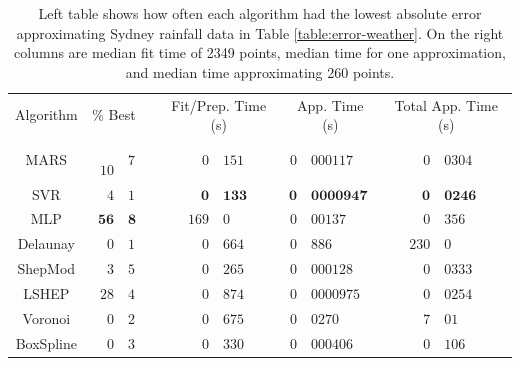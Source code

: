 \documentclass[smallextended,final]{svjour3}  %
\begin{document}
\begin{appendix}
\begin{table}
  \centering
  \begin{tabular}{|c|r@{.}l| c |r@{.}l|r@{.}l|r@{.}l|}
    \cline{1-3}\cline{5-10}
    Algorithm & \multicolumn{2}{c|}{\% Best} &  & \multicolumn{2}{c|}{Fit/Prep. Time (s)} & \multicolumn{2}{c|}{App. Time (s)} & \multicolumn{2}{c|}{Total App. Time (s)}\\
    \cline{1-3}\cline{5-10}
    MARS & \,\,\,\,$10$&$7$ &  & \quad\quad\quad$\mathit{0}$&$\mathit{151}$ & \quad$0$&$000117$ & \quad\quad\quad\,\,$0$&$0304$\\
    SVR & $4$&$1$ &  & $\mathbf{0}$&$\mathbf{133}$ & $\mathbf{0}$&$\mathbf{0000947}$ & $\mathbf{0}$&$\mathbf{0246}$\\
    MLP & $\mathbf{56}$&$\mathbf{8}$ &  & $169$&$0$ & $0$&$00137$ & $0$&$356$\\
    Delaunay & $0$&$1$ &  & $0$&$664$ & $0$&$886$ & $230$&$0$\\
    ShepMod & $3$&$5$ &  & $0$&$265$ & $0$&$000128$ & $0$&$0333$\\
    LSHEP & $\mathit{28}$&$\mathit{4}$ &  & $0$&$874$ & $\mathit{0}$&$\mathit{0000975}$ & $\mathit{0}$&$\mathit{0254}$\\
    Voronoi & $0$&$2$ &  & $0$&$675$ & $0$&$0270$ & $7$&$01$\\
    BoxSpline & $0$&$3$ &  & $0$&$330$ & $0$&$000406$ & $0$&$106$\\
    \cline{1-3}\cline{5-10}
  \end{tabular}
  \caption{Left table shows how often each algorithm had the lowest
    absolute error approximating Sydney rainfall data in Table
    \ref{table:error-weather}. On the right columns are median fit
    time of 2349 points, median time for one approximation, and median
    time approximating 260 points.}
  \label{table:best-weather}
\end{table}



\end{appendix}
\end{document}
